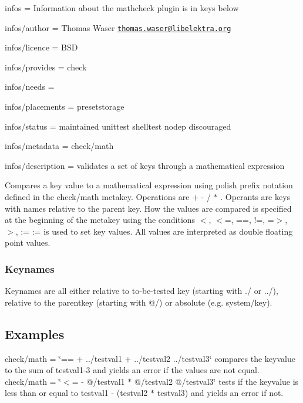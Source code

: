 
\begin{DoxyItemize}
\item infos = Information about the mathcheck plugin is in keys below
\item infos/author = Thomas Waser \href{mailto:thomas.waser@libelektra.org}{\tt thomas.\+waser@libelektra.\+org}
\item infos/licence = B\+SD
\item infos/provides = check
\item infos/needs =
\item infos/placements = presetstorage
\item infos/status = maintained unittest shelltest nodep discouraged
\item infos/metadata = check/math
\item infos/description = validates a set of keys through a mathematical expression
\end{DoxyItemize}

Compares a key value to a mathematical expression using polish prefix notation defined in the {\ttfamily check/math} metakey. Operations are {\ttfamily + -\/ / $\ast$} . Operants are keys with names relative to the parent key. How the values are compared is specified at the beginning of the metakey using the conditions {\ttfamily $<$, $<$=, ==, !=, =$>$, $>$, \+:=} {\ttfamily \+:=} is used to set key values. All values are interpreted as {\ttfamily double} floating point values.

\subsubsection*{Keynames}

Keynames are all either relative to to-\/be-\/tested key (starting with {\ttfamily ./} or {\ttfamily ../}), relative to the parentkey (starting with {\ttfamily @/}) or absolute (e.\+g. {\ttfamily system/key}).

\subsection*{Examples}

{\ttfamily check/math = \char`\"{}== + ../testval1 + ../testval2 ../testval3\char`\"{}} compares the keyvalue to the sum of testval1-\/3 and yields an error if the values are not equal. {\ttfamily check/math = \char`\"{}$<$= -\/ @/testval1 $\ast$ @/testval2 @/testval3\char`\"{}} tests if the keyvalue is less than or equal to {\ttfamily testval1 -\/ (testval2 $\ast$ testval3)} and yields an error if not.

